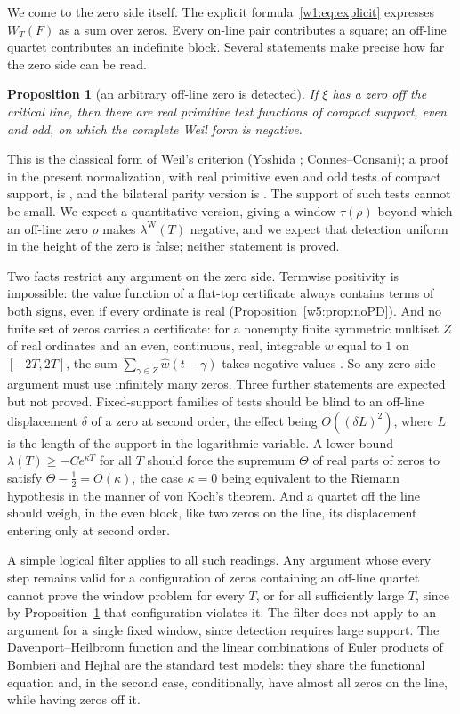 \documentclass[11pt]{amsart}
\newtheorem{proposition}[theorem]{Proposition}
\theoremstyle{definition}
\theoremstyle{remark}
\numberwithin{equation}{section}
\newcommand{\WT}{W_T}                                  %
\newcommand{\lam}{\lambda(T)}                          %
\newcommand{\lamW}{\lambda^{\mathrm W}(T)}             %
\begin{document}
We come to the zero side itself. The explicit formula~\eqref{w1:eq:explicit} expresses $\WT(F)$ as
a sum over zeros. Every on-line pair contributes a square; an off-line quartet contributes an
indefinite block. Several statements make precise how far the zero side can be read.

\begin{proposition}[an arbitrary off-line zero is detected]\label{w6:prop:detect}
If $\xi$ has a zero off the critical line, then there are real primitive test functions of compact
support, even and odd, on which the complete Weil form is negative.
\end{proposition}

This is the classical form of Weil's criterion (Yoshida \cite{Yoshida1992}; Connes--Consani); a proof
in the present normalization, with real primitive even and odd tests of compact support, is
\cite[Theorem~6.2]{P45}, and the bilateral parity version is \cite[Theorem~13.2]{P39}. The
support of such tests cannot be small. We expect a quantitative version, giving a window
$\tau(\rho)$ beyond which an off-line zero $\rho$ makes $\lamW$ negative, and we expect that
detection uniform in the height of the zero is false; neither statement is proved.

Two facts restrict any argument on the zero side. Termwise positivity is impossible: the value
function of a flat-top certificate always contains terms of both signs, even if every ordinate is
real (Proposition~\ref{w5:prop:noPD}). And no finite set of zeros carries a certificate: for a
nonempty finite symmetric multiset $Z$ of real ordinates and an even, continuous, real, integrable
$w$ equal to $1$ on $[-2T,2T]$, the sum $\sum_{\gamma\in Z}\widehat w(t-\gamma)$ takes negative
values \cite[Theorem~6.5]{P46}. So any zero-side argument must use infinitely many zeros. Three
further statements are expected but not proved. Fixed-support families of tests should be blind to
an off-line displacement $\delta$ of a zero at second order, the effect being $O((\delta L)^2)$,
where $L$ is the length of the support in the logarithmic variable. A lower bound
$\lam\ge-Ce^{\kappa T}$ for all $T$ should force the supremum $\Theta$ of real parts of zeros to
satisfy $\Theta-\frac12=O(\kappa)$, the case $\kappa=0$ being equivalent to the Riemann hypothesis
in the manner of von Koch's theorem. And a quartet off the line should weigh, in the even block,
like two zeros on the line, its displacement entering only at second order.

A simple logical filter applies to all such readings. Any argument whose every step remains valid
for a configuration of zeros containing an off-line quartet cannot prove the window problem for
every $T$, or for all sufficiently large $T$, since by Proposition~\ref{w6:prop:detect} that
configuration violates it. The filter does not apply to an argument for a single fixed window,
since detection requires large support. The Davenport--Heilbronn function and the linear
combinations of Euler products of Bombieri and Hejhal \cite{BombieriHejhal1995} are the standard
test models: they share the functional equation and, in the second case, conditionally, have
almost all zeros on the line, while having zeros off it.
\end{document}
